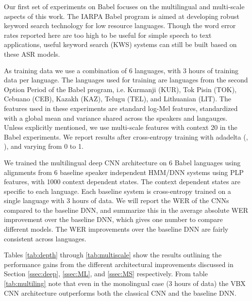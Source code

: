 \documentclass{article}
\begin{document}
Our first set of experiments on Babel focuses on the multilingual and multi-scale
aspects of this work.
The IARPA Babel program is aimed at developing robust keyword search technology
for low resource languages.
Though the word error rates reported here are too high to be useful for simple speech to text applications,
useful keyword search (KWS) systems can still be built based on these ASR models.

As training data we use a combination of 6 languages, with 3 hours
of training data per language.
The languages used for training are languages from the second Option Period of the Babel
program, i.e. Kurmanji (KUR), Tok Pisin (TOK), Cebuano (CEB), Kazakh (KAZ), Telugu (TEL),
and Lithuanian (LIT).
The features used in these experiments are standard log-Mel features,
standardized with a global mean and variance shared across the speakers and langauges.
Unless explicitly mentioned, we use multi-scale features with context 20 in the Babel experiments.
We report results after cross-entropy training with adadelta (, ),
and  varying from 0 to 1.

We trained the multilingual deep CNN architecture on 6 Babel languages using
alignments from 6 baseline speaker independent HMM/DNN systems using PLP features,
with 1000 context dependent states.
The context dependent states are specific to each language.
Each baseline system is cross-entropy trained on a single language with 3 hours of data.
We will report the WER of the CNNs compared to the baseline DNN,
and summarize this in the average absolute WER improvement over the baseline DNN,
which gives one number to compare different models.
The WER improvements over the baseline DNN are fairly consistent across languages.

Tables \ref{tab:depth} through \ref{tab:multiscale}
show the results outlining the performance gains from the different architectural improvements 
discussed in Section \ref{ssec:deep}, \ref{ssec:ML}, and \ref{ssec:MS} respectively.
From table \ref{tab:multiling} note that even in the monolingual case
(3 hours of data) the VBX CNN architecture outperforms both the classical CNN and the baseline DNN.
\end{document}
